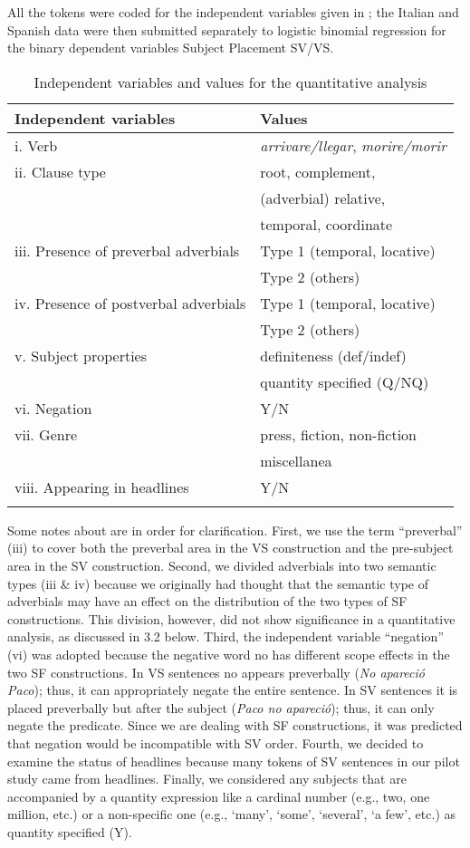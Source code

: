 \documentclass[output=paper,colorlinks,citecolor=brown,
]{langscibook}
\begin{document}
All the tokens were coded for the independent variables given in ; the Italian and Spanish data were then submitted separately to logistic binomial regression for the binary dependent variables Subject Placement SV/VS.

\begin{table} 
\begin{tabularx}{\textwidth}{lX}\lsptoprule
Independent variables & Values\\
\midrule
       i.     Verb & \textit{arrivare/llegar}, \textit{morire/morir}\\
ii.   Clause type & root, complement,\\ & (adverbial) relative,\\ & temporal, coordinate\\
iii.   Presence of preverbal adverbials  & Type 1 (temporal, locative)\\ & Type 2 (others)\\
iv.   Presence of postverbal adverbials &
Type 1 (temporal, locative)\\ & Type 2 (others)\\
v.    Subject properties & definiteness (def/indef)\\
 & quantity specified (Q/NQ)\\
vi.   Negation & Y/N\\
vii.  Genre & press, fiction, non-fiction\\
 & miscellanea\\
viii. Appearing in headlines & Y/N \\
\lspbottomrule
\end{tabularx}
    \caption{Independent variables and values for the quantitative analysis}
    \label{tab:nishida:2}
\end{table}


Some notes about  are in order for clarification. First, we use the term ``preverbal'' (iii) to cover both the preverbal area in the VS construction and the pre-subject area in the SV construction. Second, we divided adverbials into two semantic types (iii \& iv) because we originally had thought that the semantic type of adverbials may have an effect on the distribution of the two types of SF constructions. This division, however, did not show significance in a quantitative analysis, as discussed in 3.2 below. Third, the independent variable 
``negation'' (vi) was adopted because the negative word no has different scope effects in the two SF constructions. In VS sentences no appears preverbally (\textit{No apareció Paco}); thus, it can appropriately negate the entire sentence. In SV sentences it is placed preverbally but after the subject (\textit{Paco no apareció}); thus, it can only negate the predicate. Since we are dealing with SF constructions, it was predicted that negation would be incompatible with SV order. Fourth, we decided to examine the status of headlines because many tokens of SV sentences in our pilot study came from headlines. Finally, we considered any subjects that are accompanied by a quantity expression like a cardinal number (e.g., two, one million, etc.) or a non-specific one (e.g., 
`many', `some', `several', `a few', etc.) as quantity specified (Y).
\end{document}
